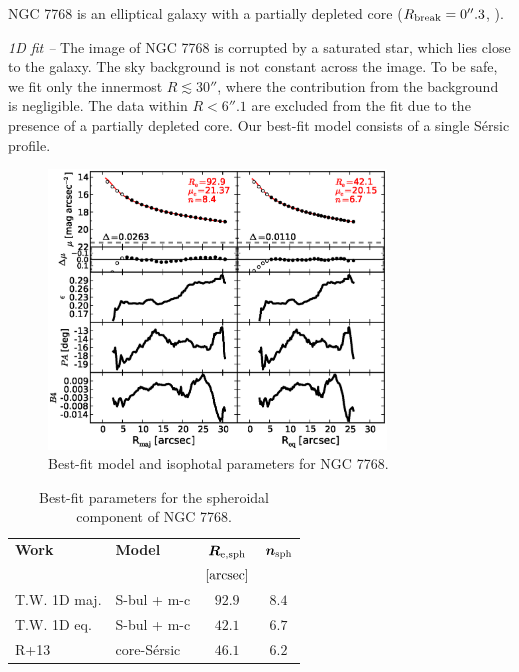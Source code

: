 \documentclass[preprint2]{emulateapj}
\newcommand{\fitfigurewidth}{0.8\textwidth}
\begin{document}
  NGC 7768 is an elliptical galaxy with a partially depleted core ($R_{\rm break} = 0''.3$, \citealt{rusli2013}).


  \emph{1D fit -- }
  The image of NGC 7768 is corrupted by a saturated star, which lies close to the galaxy.
  The sky background is not constant across the image.
  To be safe, we fit only the innermost $R \lesssim 30''$, where the contribution from the background is negligible.
  The data within $R < 6''.1$ are excluded from the fit due to the presence of a partially depleted core.
  Our best-fit model consists of a single S\'ersic profile.

  \begin{figure}[h]
  \begin{center}
  \includegraphics[width=\fitfigurewidth]{images/n7768_1Dfit.eps}
  \caption{Best-fit model and isophotal parameters for NGC 7768.}
  \end{center}
  \end{figure}

  \begin{table}[h]
  \small
  \caption{Best-fit parameters for the spheroidal component of NGC 7768.}
  \begin{center}
  \begin{tabular}{llcc}
  \hline
  {\bf Work} & {\bf Model}   & $\bm R_{\rm e,sph}$    & $\bm n_{\rm sph}$ \\
    &  &  $[\rm arcsec]$ & \\
  \hline
  T.W. 1D maj. & S-bul + m-c & $92.9$  &  $8.4$ \\
  T.W. 1D eq.  & S-bul + m-c & $42.1$  &  $6.7$ \\
  \hline
  R+13      & core-S\'ersic & $46.1$  &  $6.2$ \\
  \hline
  \end{tabular}
  \end{center}
  \label{tab:n7768}
  \end{table}
   
\end{document}
